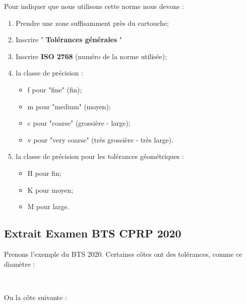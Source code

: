 \documentclass[
	11pt, %
	fleqn, %
	a4paper, %
]{LegrandOrangeBook}
\begin{document}
Pour indiquer que nous utilisons cette norme nous devons :\\
\begin{enumerate}
    \item  Prendre une zone suffisamment près du	cartouche;
    \item Inscrire " \textbf{Tolérances générales} " 
    \item Inscrire \textbf{ISO	2768}	(numéro de la norme utilisée);
    \item la classe de précision :
          \begin{itemize} 
            \item f pour "fine" (fin);
            \item m pour "medium" (moyen);
            \item c pour "coarse" (grossière - large);
            \item v pour "very coarse" (très grossière - très large).
           \end{itemize}
        \item la classe	de	précision pour les	tolérances géométriques :
         \begin{itemize}           
                \item H pour fin;
                \item K pour moyen;
                \item M pour large.
            \end{itemize}
\end{enumerate}


\subsection*{Extrait Examen BTS CPRP 2020}

Prenons l'exemple du BTS 2020. Certaines côtes ont des tolérances, comme ce diamètre :    \\

\vspace{1 cm}

Ou la côte suivante : 
 \\
\end{document}
